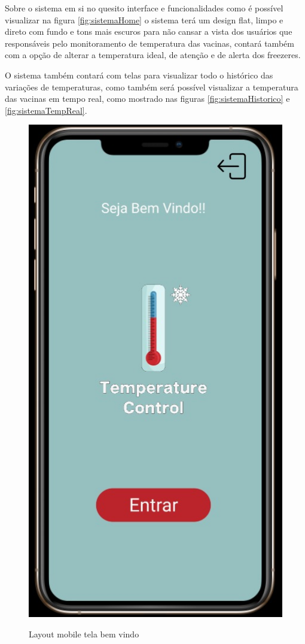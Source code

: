     Sobre o sistema em si no quesito interface e funcionalidades
    como é possível visualizar na figura \ref{fig:sistemaHome}
    o sistema terá um design flat, limpo e direto com fundo e 
    tons mais escuros para não cansar a vista dos usuários que 
    responsáveis pelo monitoramento de temperatura das vacinas,
    contará também com a opção de alterar a temperatura ideal,
    de atenção e de alerta dos freezeres.


    O sistema também contará com telas para visualizar todo
    o histórico das variações de temperaturas, 
    como também será possível visualizar a temperatura 
    das vacinas em tempo real, como mostrado nas figuras
    \ref{fig:sistemaHistorico} e \ref{fig:sistemaTempReal}.

    \begin{figure}[htb!]
        \caption{Layout mobile tela bem vindo}
        \centering
        \includegraphics[scale=0.5]{img/mobile/bem_vindo.png}
        \label{fig:mobileBemVindo}
    \end{figure}

